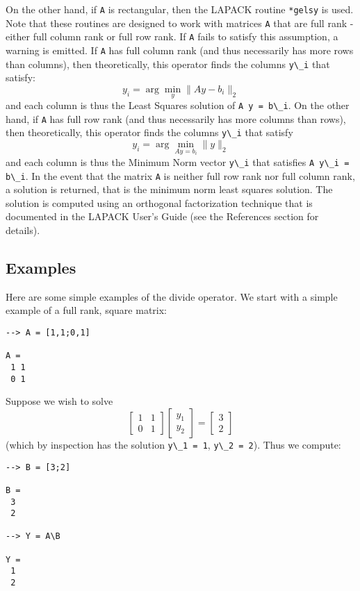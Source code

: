 On the other hand, if \verb|A| is rectangular, then the LAPACK routine \verb|*gelsy| is used.  Note that these routines are designed to work with matrices \verb|A| that are full rank - either full column rank or full row rank.  If \verb|A| fails to satisfy this assumption, a warning is emitted.  If \verb|A| has full column rank (and thus necessarily has more rows than columns), then theoretically, this operator finds the columns \verb|y\_i| that satisfy:
\[
  y_i = \arg \min_y \| A y - b_i \|_2
\]
and each column is thus the Least Squares solution of \verb|A y = b\_i|.  On the other hand, if \verb|A| has full row rank (and thus necessarily has more columns than rows), then theoretically, this operator finds the columns \verb|y\_i| that satisfy
\[
  y_i = \arg \min_{A y = b_i} \| y \|_2
\]
and each column is thus the Minimum Norm vector \verb|y\_i| that satisfies \verb|A y\_i = b\_i|.  
In the event that the matrix \verb|A| is neither full row rank nor full column rank, a solution is returned, that is the minimum norm least squares solution.  The solution is computed using an orthogonal factorization technique that is documented in the LAPACK User's Guide (see the References section for details).
\subsection{Examples}

Here are some simple examples of the divide operator.  We start with a simple example of a full rank, square matrix:
\begin{verbatim}
--> A = [1,1;0,1]

A = 
 1 1 
 0 1 
\end{verbatim}
Suppose we wish to solve
\[
  \begin{bmatrix} 1 & 1 \\ 0 & 1 \end{bmatrix}
  \begin{bmatrix} y_1 \\ y_2 \end{bmatrix}
 = 
  \begin{bmatrix} 3 \\ 2 \end{bmatrix}
\]
(which by inspection has the solution \verb|y\_1 = 1|, \verb|y\_2 = 2|).  Thus we compute:
\begin{verbatim}
--> B = [3;2]

B = 
 3 
 2 

--> Y = A\B

Y = 
 1 
 2 
\end{verbatim}

